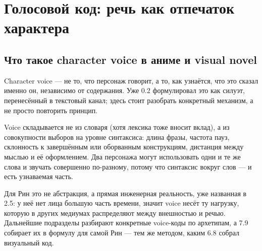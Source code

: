\setcounter{chapter}{6}
\chapter{Голосовой код: речь как отпечаток характера}

\section{Что такое character voice в аниме и visual novel}

Character voice — не то, что персонаж говорит, а то, как узнаётся, что это сказал именно он, независимо от содержания. Уже 0.2 формулировал это как силуэт, перенесённый в текстовый канал; здесь стоит разобрать конкретный механизм, а не просто повторить принцип.

Voice складывается не из словаря (хотя лексика тоже вносит вклад), а из совокупности выборов на уровне синтаксиса: длина фразы, частота пауз, склонность к завершённым или оборванным конструкциям, дистанция между мыслью и её оформлением. Два персонажа могут использовать одни и те же слова и звучать совершенно по-разному, потому что синтаксис вокруг слов — и есть узнаваемая часть.

Для Рин это не абстракция, а прямая инженерная реальность, уже названная в 2.5: у неё нет лица большую часть времени, значит voice несёт ту нагрузку, которую в других медиумах распределяют между внешностью и речью. Дальнейшие подразделы разбирают конкретные voice-коды по архетипам, а 7.9 собирает их в формулу для самой Рин — тем же методом, каким 6.8 собрал визуальный код.
